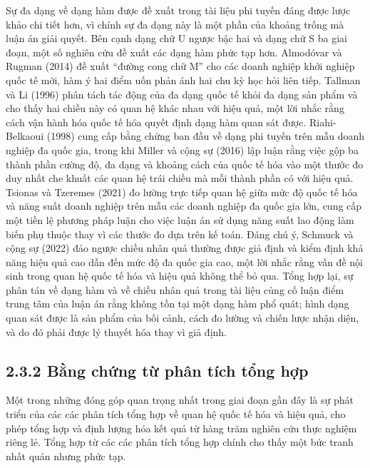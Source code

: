 \documentclass[
  a4paper,
  13pt]{extreport}
\begin{document}
Sự đa dạng về dạng hàm được đề xuất trong tài liệu phi tuyến đáng được
lược khảo chi tiết hơn, vì chính sự đa dạng này là một phần của khoảng
trống mà luận án giải quyết. Bên cạnh dạng chữ U ngược bậc hai và dạng
chữ S ba giai đoạn, một số nghiên cứu đề xuất các dạng hàm phức tạp hơn.
Almodóvar và Rugman (2014) đề xuất ``đường cong chữ M'' cho các doanh
nghiệp khởi nghiệp quốc tế mới, hàm ý hai điểm uốn phản ánh hai chu kỳ
học hỏi liên tiếp. Tallman và Li (1996) phân tách tác động của đa dạng
quốc tế khỏi đa dạng sản phẩm và cho thấy hai chiều này có quan hệ khác
nhau với hiệu quả, một lời nhắc rằng cách vận hành hóa quốc tế hóa quyết
định dạng hàm quan sát được. Riahi-Belkaoui (1998) cung cấp bằng chứng
ban đầu về dạng phi tuyến trên mẫu doanh nghiệp đa quốc gia, trong khi
Miller và cộng sự (2016) lập luận rằng việc gộp ba thành phần cường độ,
đa dạng và khoảng cách của quốc tế hóa vào một thước đo duy nhất che
khuất các quan hệ trái chiều mà mỗi thành phần có với hiệu quả. Tsionas
và Tzeremes (2021) đo lường trực tiếp quan hệ giữa mức độ quốc tế hóa và
năng suất doanh nghiệp trên mẫu các doanh nghiệp đa quốc gia lớn, cung
cấp một tiền lệ phương pháp luận cho việc luận án sử dụng năng suất lao
động làm biến phụ thuộc thay vì các thước đo dựa trên kế toán. Đáng chú
ý, Schmuck và cộng sự (2022) đảo ngược chiều nhân quả thường được giả
định và kiểm định khả năng hiệu quả cao dẫn đến mức độ đa quốc gia cao,
một lời nhắc rằng vấn đề nội sinh trong quan hệ quốc tế hóa và hiệu quả
không thể bỏ qua. Tổng hợp lại, sự phân tán về dạng hàm và về chiều nhân
quả trong tài liệu củng cố luận điểm trung tâm của luận án rằng không
tồn tại một dạng hàm phổ quát; hình dạng quan sát được là sản phẩm của
bối cảnh, cách đo lường và chiến lược nhận diện, và do đó phải được lý
thuyết hóa thay vì giả định.

\hypertarget{bux1eb1ng-chux1ee9ng-tux1eeb-phuxe2n-tuxedch-tux1ed5ng-hux1ee3p}{%
\subsection{2.3.2 Bằng chứng từ phân tích tổng
hợp}\label{bux1eb1ng-chux1ee9ng-tux1eeb-phuxe2n-tuxedch-tux1ed5ng-hux1ee3p}}

Một trong những đóng góp quan trọng nhất trong giai đoạn gần đây là sự
phát triển của các các phân tích tổng hợp về quan hệ quốc tế hóa và hiệu
quả, cho phép tổng hợp và định lượng hóa kết quả từ hàng trăm nghiên cứu
thực nghiệm riêng lẻ. Tổng hợp từ các các phân tích tổng hợp chính cho
thấy một bức tranh nhất quán nhưng phức tạp.
\end{document}
